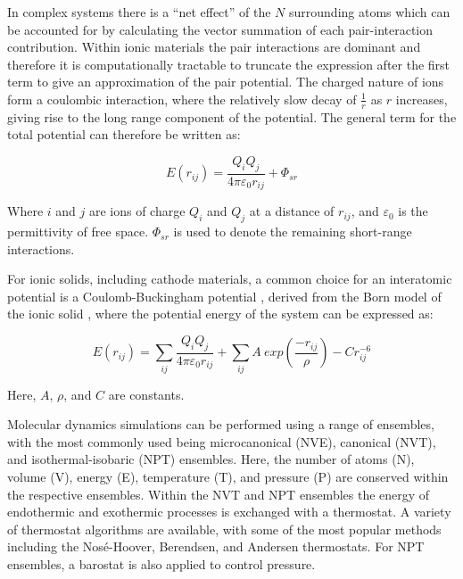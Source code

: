 \documentclass[../main.tex]{subfiles}
\begin{document}
In complex systems there is a ``net effect'' of the $N$ surrounding atoms which can be accounted for by calculating the vector summation of each pair-interaction contribution. Within ionic materials the pair interactions are dominant and therefore it is computationally tractable to truncate the expression after the first term \cite{harding_computer_1990} to give an approximation of the pair potential. The charged nature of ions form a coulombic interaction, where the relatively slow decay of $\frac{1}{r}$ as $r$ increases, giving rise to the long range component of the potential. The general term for the total potential can therefore be written as:

\begin{equation}
    E(r_{ij}) = \frac{Q_i Q_j}{4\pi \varepsilon_0 r_{ij}} + \Phi_{sr}
\end{equation}

Where $i$ and $j$ are ions of charge $Q_i$ and $Q_j$ at a distance of $r_{ij}$, and $\varepsilon_0$ is the permittivity of free space. $\Phi_{sr}$ is used to denote the remaining short-range interactions.

For ionic solids, including cathode materials, a common choice for an interatomic potential is a Coulomb-Buckingham potential \cite{buckingham_classical_1938}, derived from the Born model of the ionic solid \cite{born_1932, mayer_1932}, where the potential energy of the system can be expressed as:

\begin{equation}
    E(r_{ij}) =  \sum_{ij} \frac{Q_i Q_j}{4\pi \varepsilon_0 r_{ij}} + \sum_{ij} A \ exp(\frac{-r_{ij}}{\rho}) - Cr_{ij}^{-6}
    \label{eqn:buckingham}
\end{equation}

Here, $A$, $\rho$, and $C$ are constants.

Molecular dynamics simulations can be performed using a range of ensembles, with the most commonly used being microcanonical (NVE), canonical (NVT), and isothermal-isobaric (NPT) ensembles. \cite{todorov2006dl_poly_3, PLIMPTON19951, gale_gulp_1997} Here, the number of atoms (N), volume (V), energy (E), temperature (T), and pressure (P) are conserved within the respective ensembles. Within the NVT and NPT ensembles the energy of endothermic and exothermic processes is exchanged with a thermostat. A variety of thermostat algorithms are available, with some of the most popular methods including the Nos\'{e}-Hoover, Berendsen, and Andersen thermostats. \cite{todorov2006dl_poly_3, PLIMPTON19951, gale_gulp_1997} For NPT ensembles, a barostat is also applied to control pressure.
\end{document}
